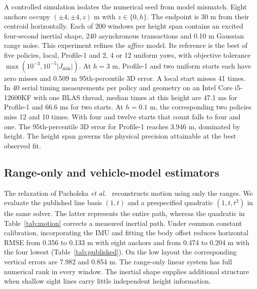 \documentclass{IEEEtaes}
\begin{document}
A controlled simulation isolates the numerical seed from model mismatch. Eight anchors occupy \((\pm4,\pm4,z)\) m with \(z\in\{0,h\}\). The endpoint is 30 m from their centroid horizontally. Each of 200 windows per height span contains an excited four-second inertial shape, 240 asynchronous transactions and 0.10 m Gaussian range noise. This experiment refines the \emph{affine} model. Its reference is the best of five policies, local, Profile-1 and 2, 4 or 12 uniform yaws, with objective tolerance \(\max(10^{-3},10^{-5}|J_{\min}|)\). At \(h=3\) m, Profile-1 and two uniform starts each have zero misses and 0.509 m 95th-percentile 3D error. A local start misses 41 times. In 40 serial timing measurements per policy and geometry on an Intel Core i5-12600KF with one BLAS thread, median times at this height are 47.1 ms for Profile-1 and 66.6 ms for two starts. At \(h=0.1\) m, the corresponding two policies miss 12 and 10 times. With four and twelve starts that count falls to four and one. The 95th-percentile 3D error for Profile-1 reaches 3.946 m, dominated by height. The height span governs the physical precision attainable at the best observed fit.

\subsection{Range-only and vehicle-model estimators}
The relaxation of Pacholska \emph{et al.}~\cite{pacholska} reconstructs motion using only the ranges. We evaluate the published line basis \((1,t)\) and a prespecified quadratic \((1,t,t^2)\) in the same solver. The latter represents the entire path, whereas the quadratic in Table~\ref{tab:motion} corrects a measured inertial path. Under common constant calibration, incorporating the IMU and fitting the body offset reduces horizontal RMSE from 0.356 to 0.133 m with eight anchors and from 0.474 to 0.204 m with the four lowest (Table~\ref{tab:published}). On the low layout the corresponding vertical errors are 7.982 and 0.854 m. The range-only linear system has full numerical rank in every window. The inertial shape supplies additional structure when shallow sight lines carry little independent height information.
\end{document}
